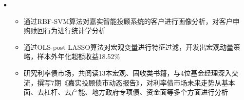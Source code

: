   \begin{itemize}[leftmargin=*]
    \item
      {\small
      \begin{itemize}
        \item 通过RBF-SVM算法对嘉实智能投顾系统的客户进行画像分析，对客户申购赎回行为进行统计学分析
        \item 通过OLS-post LASSO算法对宏观变量进行特征过滤，开发出宏观动量策略，样本外年化超额收益18.52\%
        \item 研究利率债市场，共阅读13本宏观、固收类书籍，与4位基金经理深入交流，撰写7期《嘉实投顾债市动态报告》，对利率债市场未来走势从基本面、去杠杆、去产能、地方政府专项债、资金面等多个方面进行分析
      \end{itemize}
      }
    
  \end{itemize}
